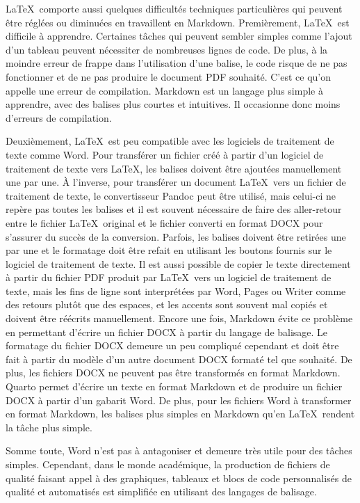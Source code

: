 \documentclass[
  letterpaper,
]{scrbook}
\begin{document}
\LaTeX~comporte aussi quelques difficultés techniques particulières qui
peuvent être réglées ou diminuées en travaillent en Markdown.
Premièrement, \LaTeX~est difficile à apprendre. Certaines tâches qui
peuvent sembler simples comme l'ajout d'un tableau peuvent nécessiter de
nombreuses lignes de code. De plus, à la moindre erreur de frappe dans
l'utilisation d'une balise, le code risque de ne pas fonctionner et de
ne pas produire le document PDF souhaité. C'est ce qu'on appelle une
erreur de compilation. Markdown est un langage plus simple à apprendre,
avec des balises plus courtes et intuitives. Il occasionne donc moins
d'erreurs de compilation.

Deuxièmement, \LaTeX~est peu compatible avec les logiciels de traitement
de texte comme Word. Pour transférer un fichier créé à partir d'un
logiciel de traitement de texte vers \LaTeX, les balises doivent être
ajoutées manuellement une par une. À l'inverse, pour transférer un
document \LaTeX~vers un fichier de traitement de texte, le convertisseur
Pandoc peut être utilisé, mais celui-ci ne repère pas toutes les balises
et il est souvent nécessaire de faire des aller-retour entre le fichier
\LaTeX~original et le fichier converti en format DOCX pour s'assurer du
succès de la conversion. Parfois, les balises doivent être retirées une
par une et le formatage doit être refait en utilisant les boutons
fournis sur le logiciel de traitement de texte. Il est aussi possible de
copier le texte directement à partir du fichier PDF produit par
\LaTeX~vers un logiciel de traitement de texte, mais les fins de ligne
sont interprétées par Word, Pages ou Writer comme des retours plutôt que
des espaces, et les accents sont souvent mal copiés et doivent être
réécrits manuellement. Encore une fois, Markdown évite ce problème en
permettant d'écrire un fichier DOCX à partir du langage de balisage. Le
formatage du fichier DOCX demeure un peu compliqué cependant et doit
être fait à partir du modèle d'un autre document DOCX formaté tel que
souhaité. De plus, les fichiers DOCX ne peuvent pas être transformés en
format Markdown. Quarto permet d'écrire un texte en format Markdown et
de produire un fichier DOCX à partir d'un gabarit Word. De plus, pour
les fichiers Word à transformer en format Markdown, les balises plus
simples en Markdown qu'en \LaTeX~rendent la tâche plus simple.

Somme toute, Word n'est pas à antagoniser et demeure très utile pour des
tâches simples. Cependant, dans le monde académique, la production de
fichiers de qualité faisant appel à des graphiques, tableaux et blocs de
code personnalisés de qualité et automatisés est simplifiée en utilisant
des langages de balisage.
\end{document}
